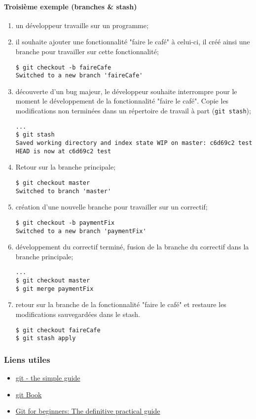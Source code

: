 \paragraph{Troisième exemple (branches \& stash)}
\begin{enumerate}
\item un développeur travaille sur un programme;
\item il souhaite ajouter une fonctionnalité "faire le café" à celui-ci, il créé ainsi une branche pour travailler sur cette fonctionnalité;
\begin{lstlisting}
$ git checkout -b faireCafe
Switched to a new branch 'faireCafe'
\end{lstlisting}
\item découverte d'un bug majeur, le développeur souhaite interrompre pour le moment le développement de la fonctionnalité "faire le café". Copie les modifications non terminées dans un répertoire de travail à part (\lstinline{git stash});
\begin{lstlisting}
...
$ git stash
Saved working directory and index state WIP on master: c6d69c2 test
HEAD is now at c6d69c2 test
\end{lstlisting}
\item Retour sur la branche principale;
\begin{lstlisting}
$ git checkout master
Switched to branch 'master'
\end{lstlisting}
\item création d'une nouvelle branche pour travailler sur un correctif;
\begin{lstlisting}
$ git checkout -b paymentFix
Switched to a new branch 'paymentFix'
\end{lstlisting}
\item développement du correctif terminé, fusion de la branche du correctif dans la branche principale;
\begin{lstlisting}
...
$ git checkout master
$ git merge paymentFix
\end{lstlisting}
\item retour sur la branche de la fonctionnalité "faire le café" et restaure les modifications sauvegardées dans le stash.
\begin{lstlisting}
$ git checkout faireCafe
$ git stash apply
\end{lstlisting}
\end{enumerate}

\subsubsection*{Liens utiles}
\begin{itemize}
\item \href{http://rogerdudler.github.io/git-guide/}{git - the simple guide}
\item \href{http://git-scm.com/book/fr}{git Book}
\item \href{http://stackoverflow.com/questions/315911/git-for-beginners-the-definitive-practical-guide#320140}{Git for beginners: The definitive practical guide}
\end{itemize}